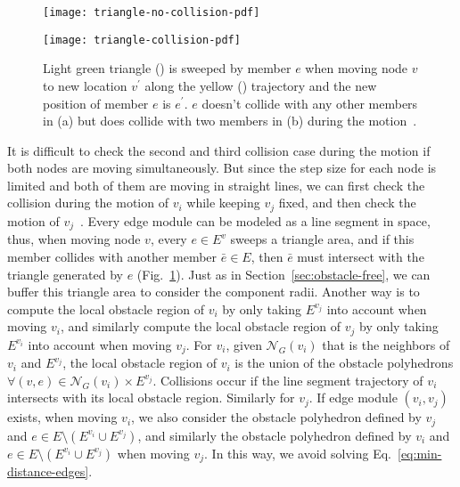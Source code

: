 \documentclass[journal]{IEEEtran}
\begin{document}
\begin{figure}[b]
  \centering
  \begin{subfloat}[]{\texttt{[image: triangle-no-collision-pdf]}\label{fig:sweep_tri}}
  \end{subfloat}
  \begin{subfloat}[]{\texttt{[image: triangle-collision-pdf]}\label{fig:sweep_tri_collision}}
  \end{subfloat}
  \caption{Light green triangle
    ({\color[rgb]{0.847,0.941,0.788}{$\blacktriangle$}}) is sweeped by
    member $e$ when moving node $v$ to new location $v^\prime$ along
    the yellow ({\color[rgb]{0.9922, 0.7490,
        0.1765}{$\bm{\rightarrow}$}}) trajectory and the new position
    of member $e$ is $e^\prime$. $e$ doesn't collide with any other
    members in (a) but does collide with two members in (b) during the
    motion~\cite{Liu-vtt-planning-iros-2019}.}
  \label{fig:collision-model}
\end{figure}

It is difficult to check the second and third collision case during
the motion if both nodes are moving simultaneously. But since the step
size for each node is limited and both of them are moving in straight
lines, we can first check the collision during the motion of $v_i$
while keeping $v_j$ fixed, and then check the motion of
$v_j$~\cite{Liu-vtt-planning-iros-2019}. Every edge module can be
modeled as a line segment in space, thus, when moving node $v$, every
$e\in E^{v}$ sweeps a triangle area, and if this member collides with
another member $\bar{e}\in E$, then $\bar{e}$ must intersect with the
triangle generated by $e$ (Fig.~\ref{fig:collision-model}). Just as in
Section~\ref{sec:obstacle-free}, we can buffer this triangle area to
consider the component radii. Another way is to compute the local
obstacle region of $v_i$ by only taking $E^{v_j}$ into account when
moving $v_i$, and similarly compute the local obstacle region of $v_j$
by only taking $E^{v_i}$ into account when moving $v_j$.  For $v_i$,
given $\mathcal{N}_G(v_i)$ that is the neighbors of $v_i$ and
$E^{v_j}$, the local obstacle region of $v_i$ is the union of the
obstacle polyhedrons
$\forall (v, e)\in \mathcal{N}_G(v_i)\times E^{v_j}$. Collisions occur
if the line segment trajectory of $v_i$ intersects with its local
obstacle region. Similarly for $v_j$. If edge module $(v_i, v_j)$
exists, when moving $v_i$, we also consider the obstacle polyhedron
defined by $v_j$ and $e\in E\setminus (E^{v_i}\cup E^{v_j})$, and
similarly the obstacle polyhedron defined by $v_i$ and
$e\in E\setminus (E^{v_i}\cup E^{v_j})$ when moving $v_j$. In this
way, we avoid solving Eq.~\eqref{eq:min-distance-edges}.
\end{document}
